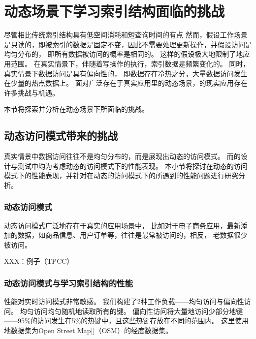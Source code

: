 \chapter{动态场景下学习索引结构面临的挑战}
\label{chap:challenge}

尽管{\li}相比传统索引结构具有低空间消耗和短查询时间的有点
然而，{\li}假设工作场景是只读的，即被索引的数据是固定不变，因此不需要处理更新操作，并假设访问是均匀分布的，
即所有数据被访问的概率是相同的。
这样的假设极大地限制了{\li}地应用范围。
在真实情景下，伴随着写操作的执行，索引数据是频繁变化的。
同时，真实情景下数据访问是具有偏向性的，
即数据存在冷热之分，大量数据访问发生在少量的热点数据上。
面对广泛存在于真实应用里的动态场景，{\li}的现实应用存在许多挑战与机遇。

本节将探索并分析{\li}在动态场景下所面临的挑战。

\section{动态访问模式带来的挑战}

真实情景中数据访问往往不是均匀分布的，而是展现出动态的访问模式。
而{\li}的设计与测试中均为考虑动态的访问模式下的性能表现。
本小节将探讨{\li}在动态的访问模式下的性能表现，并针对{\li}在动态的访问模式下的所遇到的性能问题进行研究分析。

\subsection{动态访问模式}

动态访问模式广泛地存在于真实的应用场景中，
比如对于电子商务应用，最新添加的数据，如商品信息、用户订单等，往往是最常被访问的，相反，
老数据很少被访问。

XXX：例子（TPCC）

\subsection{动态访问模式与学习索引结构的性能}

{\li}性能对实时访问模式非常敏感。
我们构建了2种工作负载{------}均匀访问与偏向性访问。
均匀访问均匀随机地读取所有的键。
偏向性访问将大量地访问少部分地键{------}95\%的访问发生在5\%的热键中，且这些热键存放在不同的范围内。
这里使用地数据集为Open Street Map[]（OSM）的经度数据集。


